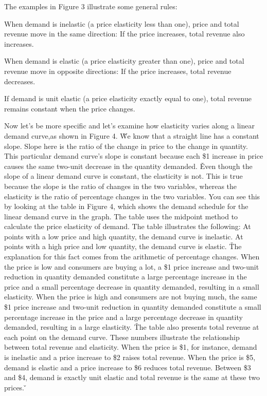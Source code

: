 The examples in Figure 3 illustrate some general rules:
\bit
\item When demand is inelastic (a price elasticity less than one), price and total revenue move in the same direction:
If the price increases, total revenue also increases.
\item When demand is elastic (a price elasticity greater than one), price and total revenue move in opposite directions:
If the price increases, total revenue decreases.
\item If demand is unit elastic (a price elasticity exactly equal to one), total revenue remains constant when the price
changes.
\eit


Now let's be more specific and let's examine how elasticity varies along a linear demand curve,as shown in Figure 4. \v

We know that a straight line has a constant slope. Slope here is the ratio of the change in price to the change in
quantity. This particular demand curve's slope is constant because each \$1 increase in price causes the same
two-unit decrease in the quantity demanded. \v

Even though the slope of a linear demand curve is constant, the elasticity is not. This is true because the slope is
the ratio of changes in the two variables, whereas the elasticity is the ratio of percentage changes in the two
variables. You can see this by looking at the table in Figure 4, which shows the demand schedule for the linear
demand curve in the graph. The table uses the midpoint method to calculate the price elasticity of demand. The table
illustrates the following: At points with a low price and high quantity, the demand curve is inelastic. At points
with a high price and low quantity, the demand curve is elastic. \v

The explanation for this fact comes from the arithmetic of percentage changes. When the price is low and consumers
are buying a lot, a \$1 price increase and two-unit reduction in quantity demanded constitute a large percentage
increase in the price and a small percentage decrease in quantity demanded, resulting in a small elasticity. When the
price is high and consumers are not buying much, the same \$1 price increase and two-unit reduction in quantity
demanded constitute a small percentage increase in the price and a large percentage decrease in quantity demanded,
resulting in a large elasticity. \v

The table also presents total revenue at each point on the demand curve. These numbers illustrate the relationship
between total revenue and elasticity. When the price is \$1, for instance, demand is inelastic and a price increase
to \$2 raises total revenue. When the price is \$5, demand is elastic and a price increase to \$6 reduces total
revenue. Between \$3 and \$4, demand is exactly unit elastic and total revenue is the same at these two prices. \v

